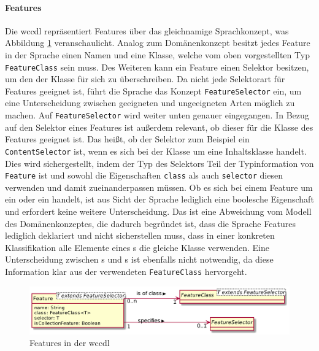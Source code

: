     \paragraph*{Features}
    Die \gls{wccdl} repräsentiert Features über das gleichnamige Sprachkonzept,
    was Abbildung \ref{image:dslFeatures} veranschaulicht.
    Analog zum Domänenkonzept besitzt jedes Feature in der Sprache einen Namen
    und eine Klasse, welche vom oben vorgestellten Typ \texttt{FeatureClass} sein muss.
    Des Weiteren kann ein Feature einen Selektor besitzen,
    um den der Klasse für sich zu überschreiben.
    Da nicht jede Selektorart für Features geeignet ist,
    führt die Sprache das Konzept \texttt{FeatureSelector} ein,
    um eine Unterscheidung zwischen geeigneten und ungeeigneten Arten möglich zu machen.
    Auf \texttt{FeatureSelector} wird weiter unten genauer eingegangen.
    In Bezug auf den Selektor eines Features ist außerdem relevant,
    ob dieser für die Klasse des Features geeignet ist.
    Das heißt, ob der Selektor zum Beispiel ein \texttt{ContentSelector} ist,
    wenn es sich bei der Klasse um eine Inhaltsklasse handelt.
    Dies wird sichergestellt,
    indem der Typ des Selektors Teil der Typinformation von
    \texttt{Feature} ist und sowohl die Eigenschaften \texttt{class} als auch
    \texttt{selector} diesen verwenden und damit zueinanderpassen müssen.
    Ob es sich bei einem Feature um ein {\scalarFeature} oder ein {\collectionFeature} handelt,
    ist aus Sicht der Sprache lediglich eine boolesche Eigenschaft und erfordert
    keine weitere Unterscheidung.
    Das ist eine Abweichung vom Modell des Domänenkonzeptes, die dadurch begründet ist,
    dass die Sprache Features lediglich deklariert und nicht sicherstellen muss,
    dass in einer konkreten Klassifikation alle Elemente eines {\collectionFeature}s die gleiche Klasse verwenden.
    Eine Unterscheidung zwischen {\contentFeature}s und {}s
    ist ebenfalls nicht notwendig,
    da diese Information klar aus der verwendeten \texttt{FeatureClass} hervorgeht.

    \begin{figure}[tb]
        \centering
        \includegraphics[scale=\imageScalingFactor]{../resources/dsl/features.png}
        \caption{Features in der \acrshort{wccdl}}
        \label{image:dslFeatures}
    \end{figure}

